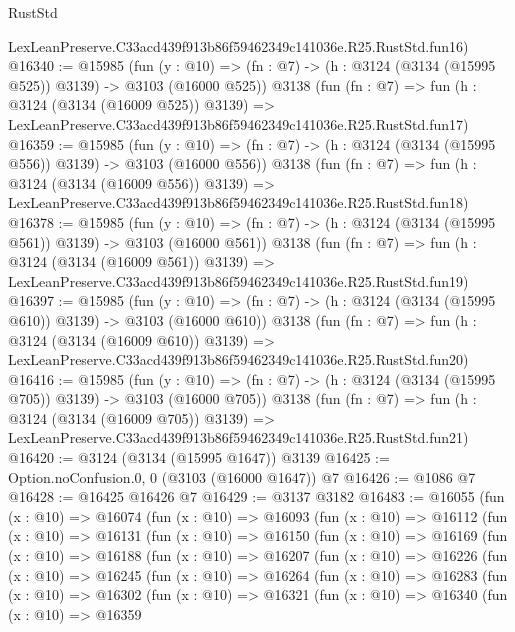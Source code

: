 \begin{lexlean}{RustStd}
\begin{coremodule}
    LexLeanPreserve.C33acd439f913b86f59462349c141036e.R25.RustStd.fun16)
@16340 := @15985
    (fun (y : @10) => (fn : @7) -> (h : @3124 (@3134 (@15995 @525)) @3139) -> @3103 (@16000 @525))
    @3138
    (fun (fn : @7) =>
    fun (h : @3124 (@3134 (@16009 @525)) @3139) =>
    LexLeanPreserve.C33acd439f913b86f59462349c141036e.R25.RustStd.fun17)
@16359 := @15985
    (fun (y : @10) => (fn : @7) -> (h : @3124 (@3134 (@15995 @556)) @3139) -> @3103 (@16000 @556))
    @3138
    (fun (fn : @7) =>
    fun (h : @3124 (@3134 (@16009 @556)) @3139) =>
    LexLeanPreserve.C33acd439f913b86f59462349c141036e.R25.RustStd.fun18)
@16378 := @15985
    (fun (y : @10) => (fn : @7) -> (h : @3124 (@3134 (@15995 @561)) @3139) -> @3103 (@16000 @561))
    @3138
    (fun (fn : @7) =>
    fun (h : @3124 (@3134 (@16009 @561)) @3139) =>
    LexLeanPreserve.C33acd439f913b86f59462349c141036e.R25.RustStd.fun19)
@16397 := @15985
    (fun (y : @10) => (fn : @7) -> (h : @3124 (@3134 (@15995 @610)) @3139) -> @3103 (@16000 @610))
    @3138
    (fun (fn : @7) =>
    fun (h : @3124 (@3134 (@16009 @610)) @3139) =>
    LexLeanPreserve.C33acd439f913b86f59462349c141036e.R25.RustStd.fun20)
@16416 := @15985
    (fun (y : @10) => (fn : @7) -> (h : @3124 (@3134 (@15995 @705)) @3139) -> @3103 (@16000 @705))
    @3138
    (fun (fn : @7) =>
    fun (h : @3124 (@3134 (@16009 @705)) @3139) =>
    LexLeanPreserve.C33acd439f913b86f59462349c141036e.R25.RustStd.fun21)
@16420 := @3124 (@3134 (@15995 @1647)) @3139
@16425 := Option.noConfusion.{0, 0} (@3103 (@16000 @1647)) @7
@16426 := @1086 @7
@16428 := @16425 @16426 @7
@16429 := @3137 @3182
@16483 := @16055
    (fun (x : @10) =>
    @16074
      (fun (x : @10) =>
      @16093
        (fun (x : @10) =>
        @16112
          (fun (x : @10) =>
          @16131
            (fun (x : @10) =>
            @16150
              (fun (x : @10) =>
              @16169
                (fun (x : @10) =>
                @16188
                  (fun (x : @10) =>
                  @16207
                    (fun (x : @10) =>
                    @16226
                      (fun (x : @10) =>
                      @16245
                        (fun (x : @10) =>
                        @16264
                          (fun (x : @10) =>
                          @16283
                            (fun (x : @10) =>
                            @16302
                              (fun (x : @10) =>
                              @16321
                                (fun (x : @10) =>
                                @16340
                                  (fun (x : @10) =>
                                  @16359

\end{coremodule}
\end{lexlean}
